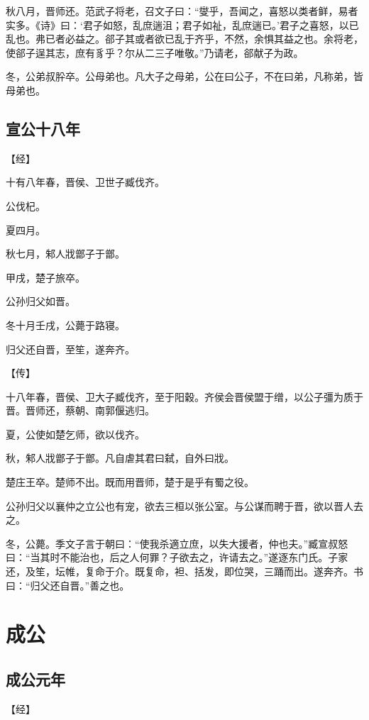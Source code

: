\documentclass[a4paper,12pt,UTF8,twoside]{ctexbook}
\begin{document}
秋八月，晋师还。范武子将老，召文子曰：“燮乎，吾闻之，喜怒以类者鲜，易者实多。《诗》曰：‘君子如怒，乱庶遄沮；君子如祉，乱庶遄已。’君子之喜怒，以已乱也。弗已者必益之。郤子其或者欲已乱于齐乎，不然，余惧其益之也。余将老，使郤子逞其志，庶有豸乎？尔从二三子唯敬。”乃请老，郤献子为政。

冬，公弟叔肸卒。公母弟也。凡大子之母弟，公在曰公子，不在曰弟，凡称弟，皆母弟也。


\section{宣公十八年}


【经】

十有八年春，晋侯、卫世子臧伐齐。

公伐杞。

夏四月。

秋七月，邾人戕鄫子于鄫。

甲戌，楚子旅卒。

公孙归父如晋。

冬十月壬戌，公薨于路寝。

归父还自晋，至笙，遂奔齐。

【传】

十八年春，晋侯、卫大子臧伐齐，至于阳穀。齐侯会晋侯盟于缯，以公子彊为质于晋。晋师还，蔡朝、南郭偃逃归。

夏，公使如楚乞师，欲以伐齐。

秋，邾人戕鄫子于鄫。凡自虐其君曰弑，自外曰戕。

楚庄王卒。楚师不出。既而用晋师，楚于是乎有蜀之役。

公孙归父以襄仲之立公也有宠，欲去三桓以张公室。与公谋而聘于晋，欲以晋人去之。



冬，公薨。季文子言于朝曰：“使我杀適立庶，以失大援者，仲也夫。”臧宣叔怒曰：“当其时不能治也，后之人何罪？子欲去之，许请去之。”遂逐东门氏。子家还，及笙，坛帷，复命于介。既复命，袒、括发，即位哭，三踊而出。遂奔齐。书曰：“归父还自晋。”善之也。


\chapter{成公}

\section{成公元年}



【经】
\end{document}
